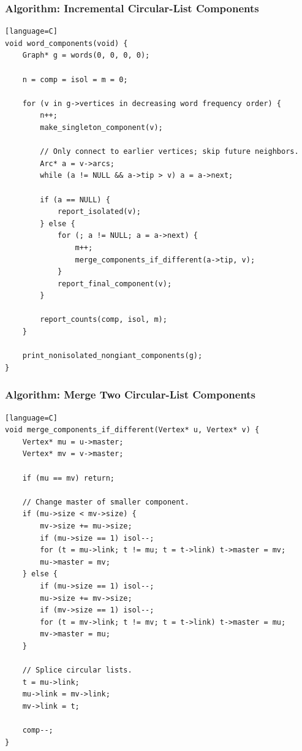 \documentclass[11pt]{article}
\begin{document}
\subsubsection{Algorithm: Incremental Circular-List Components}\label{algorithm-incremental-circular-list-components}

\begin{verbatim}[language=C]
void word_components(void) {
    Graph* g = words(0, 0, 0, 0);

    n = comp = isol = m = 0;

    for (v in g->vertices in decreasing word frequency order) {
        n++;
        make_singleton_component(v);

        // Only connect to earlier vertices; skip future neighbors.
        Arc* a = v->arcs;
        while (a != NULL && a->tip > v) a = a->next;

        if (a == NULL) {
            report_isolated(v);
        } else {
            for (; a != NULL; a = a->next) {
                m++;
                merge_components_if_different(a->tip, v);
            }
            report_final_component(v);
        }

        report_counts(comp, isol, m);
    }

    print_nonisolated_nongiant_components(g);
}
\end{verbatim}

\subsubsection{Algorithm: Merge Two Circular-List Components}\label{algorithm-merge-two-circular-list-components}

\begin{verbatim}[language=C]
void merge_components_if_different(Vertex* u, Vertex* v) {
    Vertex* mu = u->master;
    Vertex* mv = v->master;

    if (mu == mv) return;

    // Change master of smaller component.
    if (mu->size < mv->size) {
        mv->size += mu->size;
        if (mu->size == 1) isol--;
        for (t = mu->link; t != mu; t = t->link) t->master = mv;
        mu->master = mv;
    } else {
        if (mu->size == 1) isol--;
        mu->size += mv->size;
        if (mv->size == 1) isol--;
        for (t = mv->link; t != mv; t = t->link) t->master = mu;
        mv->master = mu;
    }

    // Splice circular lists.
    t = mu->link;
    mu->link = mv->link;
    mv->link = t;

    comp--;
}
\end{verbatim}
\end{document}
